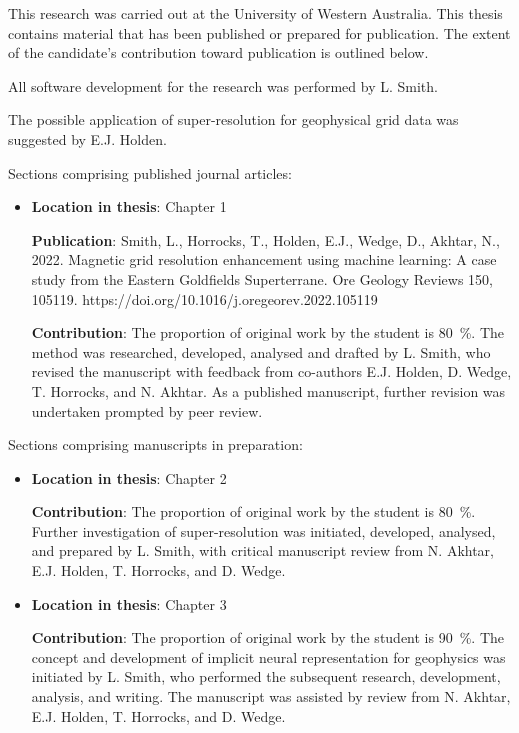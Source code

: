 \documentclass[manuscript.tex]{subfiles}
\begin{document}
This research was carried out at the University of Western Australia.
This thesis contains material that has been published or prepared for publication.
The extent of the candidate's contribution toward publication is outlined below.

\smallskip{}
\noindent{}All software development for the research was performed by L. Smith.

\noindent{}The possible application of super-resolution for geophysical grid data was suggested by E.J. Holden.

\medskip{}
\noindent{}Sections comprising published journal articles:
\begin{itemize}
      \item{}\textbf{Location in thesis}: Chapter 1

            \textbf{Publication}: Smith, L., Horrocks, T., Holden, E.J., Wedge, D., Akhtar, N., 2022. Magnetic grid resolution enhancement using machine learning: A case study from the Eastern Goldfields Superterrane. Ore Geology Reviews 150, 105119. https://doi.org/10.1016/j.oregeorev.2022.105119
            
            \textbf{Contribution}: The proportion of original work by the student is \qty{80}{\percent}.
            The method was researched, developed, analysed and drafted by L. Smith, who revised the manuscript with feedback from co-authors E.J. Holden, D. Wedge, T. Horrocks, and N. Akhtar.
            As a published manuscript, further revision was undertaken prompted by peer review.
\end{itemize}

\noindent{}Sections comprising manuscripts in preparation:
\begin{itemize}
      \item{}
            \textbf{Location in thesis}: Chapter 2

            \textbf{Contribution}: The proportion of original work by the student is \qty{80}{\percent}.
            Further investigation of super-resolution was initiated, developed, analysed, and prepared by L. Smith, with critical manuscript review from N. Akhtar, E.J. Holden, T. Horrocks, and D. Wedge.

      \item{}
            \textbf{Location in thesis}: Chapter 3

            \textbf{Contribution}: The proportion of original work by the student is \qty{90}{\percent}.
            The concept and development of implicit neural representation for geophysics was initiated by L. Smith, who performed the subsequent research, development, analysis, and writing. The manuscript was assisted by review from N. Akhtar, E.J. Holden, T. Horrocks, and D. Wedge.

\end{itemize}
\end{document}

